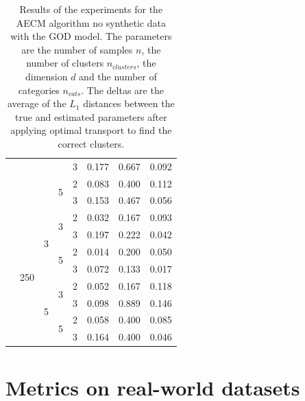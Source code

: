 \begin{table}[H]
\begin{minipage}{.48\columnwidth}
\begin{adjustbox}{width=\columnwidth}
\begin{tabular}{lllllrrr}
 &  &  &  & 3 & 0.177 & 0.667 & 0.092 \\
\cline{4-8}
 &  &  & \multirow[t]{2}{*}{5} & 2 & 0.083 & 0.400 & 0.112 \\
 &  &  &  & 3 & 0.153 & 0.467 & 0.056 \\
\cline{2-8} \cline{3-8} \cline{4-8}
 & \multirow[t]{8}{*}{250} & \multirow[t]{4}{*}{3} & \multirow[t]{2}{*}{3} & 2 & 0.032 & 0.167 & 0.093 \\
 &  &  &  & 3 & 0.197 & 0.222 & 0.042 \\
\cline{4-8}
 &  &  & \multirow[t]{2}{*}{5} & 2 & 0.014 & 0.200 & 0.050 \\
 &  &  &  & 3 & 0.072 & 0.133 & 0.017 \\
\cline{3-8} \cline{4-8}
 &  & \multirow[t]{4}{*}{5} & \multirow[t]{2}{*}{3} & 2 & 0.052 & 0.167 & 0.118 \\
 &  &  &  & 3 & 0.098 & 0.889 & 0.146 \\
\cline{4-8}
 &  &  & \multirow[t]{2}{*}{5} & 2 & 0.058 & 0.400 & 0.085 \\
 &  &  &  & 3 & 0.164 & 0.400 & 0.046 \\
\cline{1-8} \cline{2-8} \cline{3-8} \cline{4-8}
\bottomrule
\end{tabular}
\end{adjustbox}
\caption{Results of the experiments for the AECM algorithm no synthetic data with the GOD model. The parameters are the number of samples $n$, the number of clusters $n_{clusters}$, the dimension $d$ and the number of categories $n_{cats}$. The deltas are the average of the $L_1$ distances between the true and estimated parameters after applying optimal transport to find the correct clusters.}
\label{tab:results_god}
\end{minipage}
\end{table}

\section{Metrics on real-world datasets}
\label{appendix:metrics_real}

